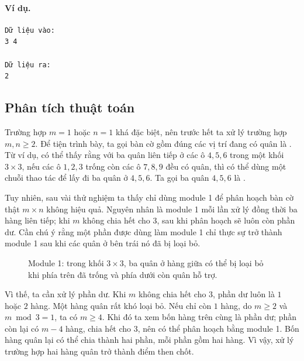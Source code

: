 \documentclass[11pt]{article}
\begin{document}
\paragraph{Ví dụ.}
\begin{verbatim}
Dữ liệu vào:
3 4

Dữ liệu ra:
2
\end{verbatim}

\subsection{Phân tích thuật toán}

Trường hợp \(m=1\) hoặc \(n=1\) khá đặc biệt, nên trước hết ta xử lý trường hợp
\(m,n\ge 2\). Để tiện trình bày, ta gọi bàn cờ gồm đúng các vị trí đang có quân
là . Từ ví dụ, có thể thấy rằng với ba quân liên tiếp ở các
ô \(4,5,6\) trong một khối \(3\times 3\), nếu các ô \(1,2,3\) trống còn các ô
\(7,8,9\) đều có quân, thì có thể dùng một chuỗi thao tác để lấy đi ba quân ở
\(4,5,6\). Ta gọi ba quân \(4,5,6\) là .

Tuy nhiên, sau vài thử nghiệm ta thấy chỉ dùng module 1 để phân hoạch bàn cờ
thật \(m\times n\) không hiệu quả. Nguyên nhân là module 1 mỗi lần xử lý đồng
thời ba hàng liên tiếp; khi \(m\) không chia hết cho \(3\), sau khi phân hoạch
sẽ luôn còn phần dư. Cần chú ý rằng một phần được dùng làm module 1 chỉ thực
sự trở thành module 1 sau khi các quân ở bên trái nó đã bị loại bỏ.

\begin{figure}[ht]
\centering
{}
\caption{Module 1: trong khối \(3\times3\), ba quân ở hàng giữa có thể bị
loại bỏ khi phía trên đã trống và phía dưới còn quân hỗ trợ.}
\end{figure}

Vì thế, ta cần xử lý phần dư. Khi \(m\) không chia hết cho \(3\), phần dư luôn
là \(1\) hoặc \(2\) hàng. Một hàng quân rất khó loại bỏ. Nếu chỉ còn \(1\)
hàng, do \(m\ge 2\) và \(m\bmod 3=1\), ta có \(m\ge 4\). Khi đó ta xem bốn
hàng trên cùng là phần dư; phần còn lại có \(m-4\) hàng, chia hết cho \(3\),
nên có thể phân hoạch bằng module 1. Bốn hàng quân lại có thể chia thành hai
phần, mỗi phần gồm hai hàng. Vì vậy, xử lý trường hợp hai hàng quân trở thành
điểm then chốt.
\end{document}
